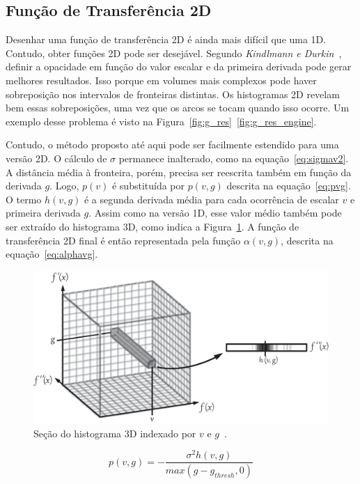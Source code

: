 \subsection{Função de Transferência 2D}
\label{subsec:gordon.2d}
    Desenhar uma função de transferência 2D é ainda mais difícil que uma 1D. Contudo, obter funções 2D pode ser desejável. Segundo \textit{Kindlmann e Durkin}~\cite{gordon}, definir a opacidade em função do valor escalar e da primeira derivada pode gerar melhores resultados. Isso porque em volumes mais complexos pode haver sobreposição nos intervalos de fronteiras distintas. Os histogramas 2D revelam bem essas sobreposições, uma vez que os arcos se tocam quando isso ocorre. Um exemplo desse problema é visto na Figura~\ref{fig:g_res}~\ref{fig:g_res_engine}.
    
    Contudo, o método proposto até aqui pode ser facilmente estendido para uma versão 2D. O cálculo de $\sigma$ permanece inalterado, como na equação~\eqref{eq:sigmav2}. A distância média à fronteira, porém, precisa ser reescrita também em função da derivada $g$. Logo, $p(v)$ é substituída por $p(v,g)$ descrita na equação~\eqref{eq:pvg}. O termo $h(v,g)$ é a segunda derivada média para cada ocorrência de escalar $v$ e primeira derivada $g$. Assim como na versão 1D, esse valor médio também pode ser extraído do histograma 3D, como indica a Figura~\ref{fig:g_hvg}. A função de transferência 2D final é então representada pela função $ \alpha(v, g) $, descrita na equação~\eqref{eq:alphavg}.
    
\begin{figure}[h]
	\centering
	\includegraphics[width=1\textwidth]{images/g_hvg}
	\caption{Seção do histograma 3D indexado por $ v $ e $ g $~\cite{gordonms}.}
	\label{fig:g_hvg}
\end{figure}
    
\begin{equation} \label{eq:pvg}
	p(v,g) = -\frac{\sigma^{2}h(v,g)}{max(g - g_{thresh}, 0)}
\end{equation} \

